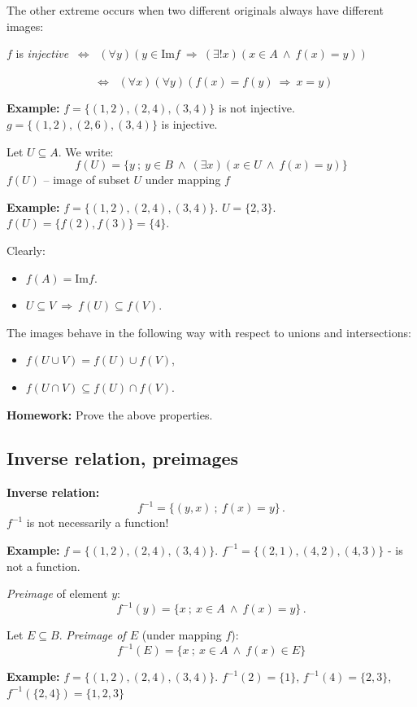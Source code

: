 \documentclass[11pt,paper=b5,footinclude,headinclude]{scrbook} %
\def\inn {{~\wedge~}}
\def\sledi {{~\Rightarrow~}}
\def\cee {{~\Leftrightarrow~}}
\theoremstyle{remark}
\theoremstyle{definition} %
\theoremstyle{theorem} %
\begin{document}
The other extreme occurs when two different originals always have different images:

$f$ is {\em injective} $\cee$ $(\forall y)(y\in \textrm{Im}f\sledi (\exists!x)(x\in A \inn f(x) = y))$

~~~~~~~~~~~~~~~$\cee$ $(\forall x)(\forall y)(f(x) = f(y) \sledi x = y)$

\bigskip
\textbf{ Example:} $f = \{(1,2),(2,4),(3,4)\}$ is not injective.
$g = \{(1,2),(2,6),(3,4)\}$ is injective.

\bigskip
Let $U\subseteq A$. We write:
$$f(U) = \{y~;~y\in B\inn (\exists x)(x\in U\inn f(x) = y)\}$$
$f(U)$ -- image of subset  $U$ under mapping $f$

\bigskip
\textbf{ Example:} $f = \{(1,2),(2,4),(3,4)\}$.
$U = \{2,3\}$. $f(U) = \{f(2),f(3)\} = \{4\}$.

\medskip
Clearly:
\begin{itemize}
  \item $f(A) = \textrm{Im}f$.
  \item $U\subseteq V\sledi f(U)\subseteq f(V)$.
\end{itemize}

The images behave in the following way with respect to unions and intersections:
\begin{itemize}
  \item $f(U\cup V) = f(U)\cup f(V)$,
  \item $f(U\cap V) \subseteq f(U)\cap f(V)$.
\end{itemize}

\textbf{ Homework:} Prove the above properties.

\subsection{Inverse relation, preimages}

\bigskip
\textbf{ Inverse relation:}
$$f^{-1} = \{(y,x)~;~f(x) = y\}\,.$$
$f^{-1}$ is not necessarily a function!

\medskip
\textbf{ Example:} $f = \{(1,2),(2,4),(3,4)\}$.
$f^{-1} = \{(2,1),(4,2),(4,3)\}$ - is not a function.

\medskip
{\em Preimage} of element $y$:
$$f^{-1}(y) = \{x~;~x\in A\inn f(x) = y\}\,.$$

Let $E\subseteq B$. {\em Preimage of $E$} (under mapping $f$):
$$f^{-1}(E) = \{x~;~x\in A\inn f(x) \in E\}$$

\medskip
\textbf{ Example:} $f = \{(1,2),(2,4),(3,4)\}$.
$f^{-1}(2) = \{1\}$, $f^{-1}(4) = \{2,3\}$, $f^{-1}(\{2,4\}) = \{1,2,3\}$
\medskip
\end{document}
